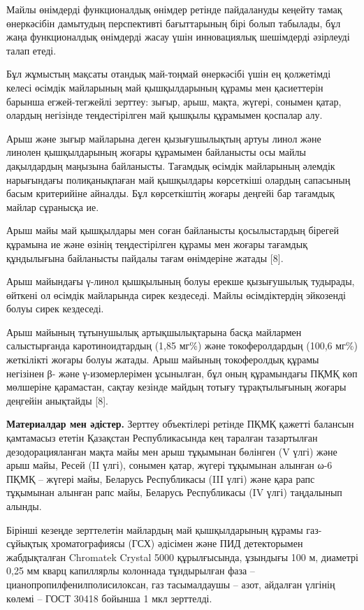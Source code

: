 \begin{multicols}{2}
Майлы өнімдерді функционалдық өнімдер ретінде пайдалануды кеңейту тамақ
өнеркәсібін дамытудың перспективті бағыттарының бірі болып табылады, бұл
жаңа функционалдық өнімдерді жасау үшін инновациялық шешімдерді
әзірлеуді талап етеді.

Бұл жұмыстың мақсаты отандық май-тоңмай өнеркәсібі үшін ең қолжетімді
келесі өсімдік майларының май қышқылдарының құрамы мен қасиеттерін
барынша егжей-тегжейлі зерттеу: зығыр, арыш, мақта, жүгері, сонымен
қатар, олардың негізінде теңдестірілген май қышқылы құрамымен қоспалар
алу.

Арыш және зығыр майларына деген қызығушылықтың артуы линол және линолен
қышқылдарының жоғары құрамымен байланысты осы майлы дақылдардың маңызына
байланысты. Тағамдық өсімдік майларының әлемдік нарығындағы
полиқанықпаған май қышқылдары көрсеткіші олардың сапасының басым
критерийіне айналды. Бұл көрсеткіштің жоғары деңгейі бар тағамдық майлар
сұранысқа ие.

Арыш майы май қышқылдары мен соған байланысты қосылыстардың бірегей
құрамына ие және өзінің теңдестірілген құрамы мен жоғары тағамдық
құндылығына байланысты пайдалы тағам өнімдеріне жатады {[}8{]}.

Арыш майындағы γ-линол қышқылының болуы ерекше қызығушылық тудырады,
өйткені ол өсімдік майларында сирек кездеседі. Майлы өсімдіктердің
эйкозенді болуы сирек кездеседі.

Арыш майының тұтынушылық артықшылықтарына басқа майлармен салыстырғанда
каротиноидтардың (1,85 мг\%) және токоферолдардың (100,6 мг\%)
жеткілікті жоғары болуы жатады. Арыш майының токоферолдық құрамы
негізінен β- және γ-изомерлерімен ұсынылған, бұл оның құрамындағы ПҚМҚ
көп мөлшеріне қарамастан, сақтау кезінде майдың тотығу тұрақтылығының
жоғары деңгейін анықтайды {[}8{]}.

{\bfseries Материалдар мен әдістер.} Зерттеу объектілері ретінде ПҚМҚ
қажетті балансын қамтамасыз ететін Қазақстан Республикасында кең
таралған тазартылған дезодорацияланған мақта майы мен арыш тұқымынан
бөлінген (V үлгі) және арыш майы, Ресей (II үлгі), сонымен қатар, жүгері
тұқымынан алынған ω-6 ПҚМҚ -- жүгері майы, Беларусь Республикасы (III
үлгі) және қара рапс тұқымынан алынған рапс майы, Беларусь Республикасы
(IV үлгі) таңдалынып алынды.

Бірінші кезеңде зерттелетін майлардың май қышқылдарының құрамы
газ-сұйықтық хроматографиясы (ГСХ) әдісімен және ПИД детекторымен
жабдықталған Chromatek Crystal 5000 құрылғысында, ұзындығы 100 м,
диаметрі 0,25 мм кварц капиллярлы колоннада тұндырылған фаза --
цианопропилфенилполисилоксан, газ тасымалдаушы -- азот, айдалған үлгінің
көлемі -- ГОСТ 30418 бойынша 1 мкл зерттелді.


\end{multicols}
